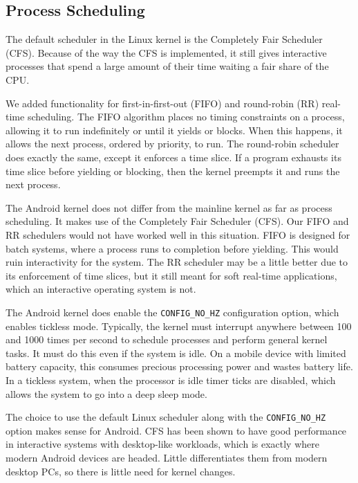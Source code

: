 \documentclass[12pt,letterpaper]{article}
\begin{document}
\subsection{Process Scheduling}

The default scheduler in the Linux kernel is the Completely Fair Scheduler
(CFS). Because of the way the CFS is implemented, it still gives interactive
processes that spend a large amount of their time waiting a fair share of the
CPU.

We added functionality for first-in-first-out (FIFO) and round-robin (RR)
real-time scheduling. The FIFO algorithm places no timing constraints on a
process, allowing it to run indefinitely or until it yields or blocks.  When
this happens, it allows the next process, ordered by priority, to run.  The
round-robin scheduler does exactly the same, except it enforces a time slice.
If a program exhausts its time slice before yielding or blocking, then the
kernel preempts it and runs the next process.

The Android kernel does not differ from the mainline kernel as far as process
scheduling. It makes use of the Completely Fair Scheduler (CFS). Our FIFO and RR
schedulers would not have worked well in this situation. FIFO is designed for
batch systems, where a process runs to completion before yielding. This would
ruin interactivity for the system. The RR scheduler may be a little better due
to its enforcement of time slices, but it still meant for soft real-time
applications, which an interactive operating system is not.

The Android kernel does enable the \texttt{CONFIG\_NO\_HZ} configuration option,
which enables tickless mode. Typically, the kernel must interrupt anywhere
between 100 and 1000 times per second to schedule processes and perform general
kernel tasks. It must do this even if the system is idle. On a mobile device
with limited battery capacity, this consumes precious processing power and
wastes battery life. In a tickless system, when the processor is idle timer
ticks are disabled, which allows the system to go into a deep sleep mode.

The choice to use the default Linux scheduler along with the
\texttt{CONFIG\_NO\_HZ} option makes sense for Android. CFS has been shown to
have good performance in interactive systems with desktop-like workloads, which
is exactly where modern Android devices are headed. Little differentiates them
from modern desktop PCs, so there is little need for kernel changes.
\end{document}
